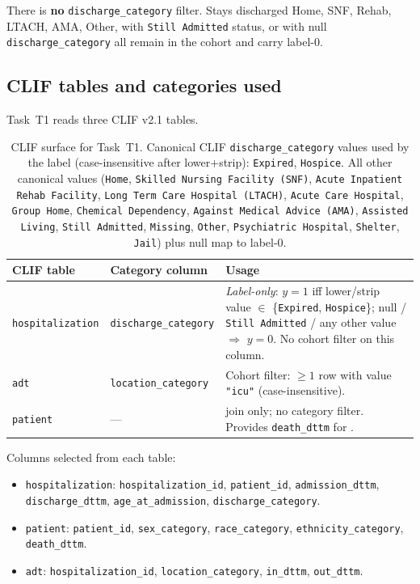 \documentclass[11pt]{article}
\newcommand{\predstop}{\text{pred\_stop}}
\begin{document}
There is \textbf{no} \texttt{discharge\_category} filter. Stays
discharged Home, SNF, Rehab, LTACH, AMA, Other, with
\texttt{Still Admitted} status, or with null \texttt{discharge\_category}
all remain in the cohort and carry label-0.

\subsection{CLIF tables and categories used}
\label{sec:t1-clif}

Task~T1 reads three CLIF v2.1 tables.

\begin{table}[H]
\centering
\small
\begin{tabular}{@{}llp{7.0cm}@{}}
\toprule
\textbf{CLIF table} & \textbf{Category column} & \textbf{Usage} \\
\midrule
\texttt{hospitalization} & \texttt{discharge\_category} &
\emph{Label-only}: $y=1$ iff lower/strip value $\in$ \{\texttt{Expired},
\texttt{Hospice}\}; null / \texttt{Still Admitted} / any other value
$\Rightarrow$ $y=0$. No cohort filter on this column. \\
\texttt{adt}             & \texttt{location\_category} & Cohort filter:
$\geq 1$ row with value \texttt{"icu"} (case-insensitive). \\
\texttt{patient}         & ---                         & join only; no
category filter. Provides \texttt{death\_dttm} for \predstop. \\
\bottomrule
\end{tabular}
\caption{CLIF surface for Task~T1. Canonical CLIF
\texttt{discharge\_category} values used by the label (case-insensitive
after lower+strip): \texttt{Expired}, \texttt{Hospice}. All other
canonical values (\texttt{Home}, \texttt{Skilled Nursing Facility
(SNF)}, \texttt{Acute Inpatient Rehab Facility}, \texttt{Long Term
Care Hospital (LTACH)}, \texttt{Acute Care Hospital},
\texttt{Group Home}, \texttt{Chemical Dependency}, \texttt{Against
Medical Advice (AMA)}, \texttt{Assisted Living}, \texttt{Still
Admitted}, \texttt{Missing}, \texttt{Other}, \texttt{Psychiatric
Hospital}, \texttt{Shelter}, \texttt{Jail}) plus null map to label-0.}
\end{table}

Columns selected from each table:
\begin{itemize}[leftmargin=2em, itemsep=0pt]
  \item \texttt{hospitalization}: \texttt{hospitalization\_id},
        \texttt{patient\_id}, \texttt{admission\_dttm},
        \texttt{discharge\_dttm}, \texttt{age\_at\_admission},
        \texttt{discharge\_category}.
  \item \texttt{patient}: \texttt{patient\_id},
        \texttt{sex\_category}, \texttt{race\_category},
        \texttt{ethnicity\_category}, \texttt{death\_dttm}.
  \item \texttt{adt}: \texttt{hospitalization\_id},
        \texttt{location\_category}, \texttt{in\_dttm}, \texttt{out\_dttm}.
\end{itemize}
\end{document}
